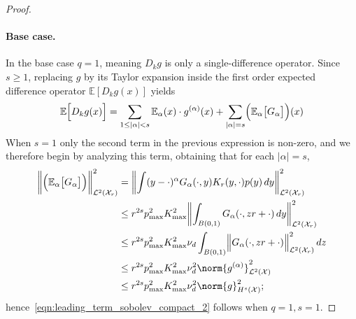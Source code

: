 \documentclass{article}
\newcommand{\abs}[1]{\left \lvert #1 \right \rvert}
\newcommand{\1}{\mathbf{1}}
\newcommand{\Xset}{\mathcal{X}}
\newcommand{\Leb}{\mathcal{L}}
\newcommand{\Ebb}{\mathbb{E}}
\theoremstyle{alden}
\theoremstyle{aldenthm}
\theoremstyle{definition}
\theoremstyle{remark}
\begin{document}
\begin{proof}
	\paragraph{Base case.}
	In the base case $q = 1$, meaning $D_kg$ is only a single-difference operator.
	Since $s \geq 1$, replacing $g$ by its Taylor expansion inside the first order expected difference operator $\Ebb[D_kg(x)]$ yields
	\begin{equation}
	\label{eqn:leading_term_sobolev_compact_pf1}
	\Ebb\Bigl[D_kg(x)\Bigr] = \sum_{1 \leq \abs{\alpha} < s} \Ebb_{\alpha}(x) \cdot g^{(\alpha)}(x)  + \sum_{\abs{\alpha} = s} \Bigl(\Ebb_{\alpha}\bigl[G_{\alpha}\bigr]\Bigr)(x)
	\end{equation}
	When $s = 1$ only the second term in the previous expression is non-zero, and we therefore begin by analyzing this term, obtaining that for each $\abs{\alpha} = s$,
	\begin{align}
	\biggl\|\Bigl(\Ebb_{\alpha}\bigl[G_{\alpha}\bigr]\Bigr)\biggr\|_{\Leb^2(\Xset_{r})}^2 & = \biggl\|\int (y - \cdot)^{\alpha} G_{\alpha}(\cdot,y) K_r(y,\cdot) p(y) \,dy\biggr\|_{\Leb^2(\Xset_{r})}^2 \nonumber \\
	& \leq r^{2s} p_{\max}^2 K_{\max}^2  \biggl\|\int_{B(0,1)} G_{\alpha}(\cdot,zr + \cdot) \,dy\biggr\|_{\Leb^2(\Xset_{r})}^2 \nonumber \\
	& \leq r^{2s} p_{\max}^2 K_{\max}^2 \nu_d \int_{B(0,1)} \Bigl\|G_{\alpha}(\cdot,zr + \cdot)\Bigr\|_{\Leb^2(\Xset_{r})}^2 \,dz \nonumber \\
	& \leq r^{2s} p_{\max}^2 K_{\max}^2 \nu_d^2 \norm{g^{(\alpha)}}_{\Leb^2(\Xset)}^2 \nonumber \\
	& \leq r^{2s} p_{\max}^2 K_{\max}^2 \nu_d^2 \norm{g}_{H^s(\Xset)}^2; \nonumber
	\end{align}
	hence~\eqref{eqn:leading_term_sobolev_compact_2} follows when $q = 1, s = 1$.
	

\end{proof}
\end{document}
